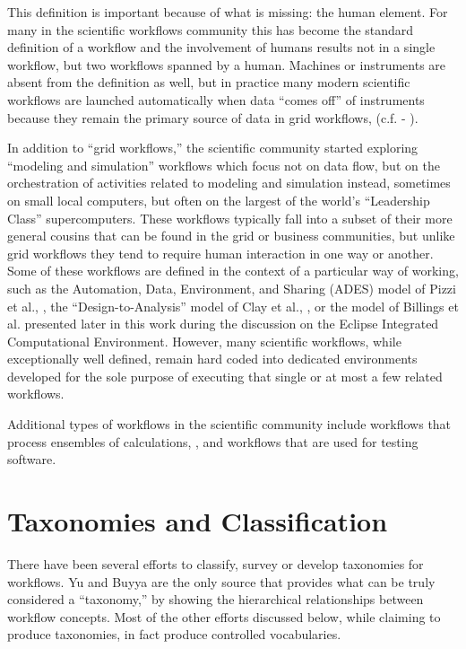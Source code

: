 This definition is important because of what is missing: the human
element. For many in the scientific workflows community this has become
the standard definition of a workflow and the involvement of humans
results not in a single workflow, but two workflows spanned by a human.
Machines or instruments are absent from the definition as well, but in
practice many modern scientific workflows are launched automatically
when data ``comes off'' of instruments because they remain the primary
source of data in grid workflows, (c.f. - \cite{megino_panda:_2015}).

In addition to ``grid workflows,'' the scientific community started
exploring ``modeling and simulation'' workflows which focus not on data
flow, but on the orchestration of activities related to modeling and
simulation instead, sometimes on small local computers, but often on the
largest of the world's ``Leadership Class'' supercomputers. These
workflows typically fall into a subset of their more general cousins
that can be found in the grid or business communities, but unlike grid
workflows they tend to require human interaction in one way or another.
Some of these workflows are defined in the context of a particular way
of working, such as the Automation, Data, Environment, and Sharing
(ADES) model of Pizzi et al., \cite{pizzi_aiida:_2016}, the
``Design-to-Analysis'' model of Clay et al., \cite{clay_incorporating_2015}, or
the model of Billings et al. presented later in this work during the
discussion on the Eclipse Integrated Computational Environment. However,
many scientific workflows, while exceptionally well defined, remain hard
coded into dedicated environments developed for the sole purpose of
executing that single or at most a few related workflows.

Additional types of workflows in the scientific community include
workflows that process ensembles of calculations, \cite{montoya_apex_2016},
and workflows that are used for testing software.

\section{Taxonomies and
Classification}\label{taxonomies-and-classification}

There have been several efforts to classify, survey or develop taxonomies
for workflows. Yu and Buyya are the only source that provides what can
be truly considered a ``taxonomy,'' by showing the hierarchical
relationships between workflow concepts. Most of the other efforts
discussed below, while claiming to produce taxonomies, in fact produce
controlled vocabularies.

